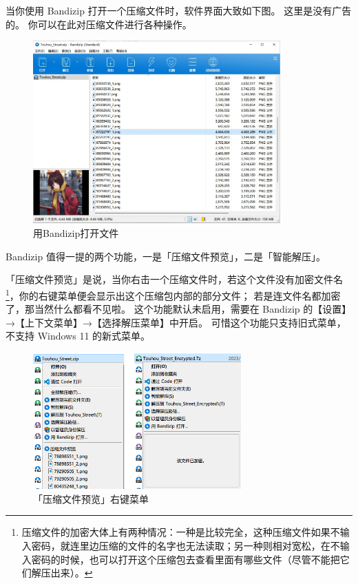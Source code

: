 当你使用 Bandizip 打开一个压缩文件时，软件界面大致如下图。
这里是没有广告的。
你可以在此对压缩文件进行各种操作。

\begin{figure}[htb!]
  \centering
  \includegraphics[width=9.5cm]{assets/Bandizip_View.jpg}
  \caption{用Bandizip打开文件}
  \label{Bandizip_View}
\end{figure}

Bandizip 值得一提的两个功能，一是「压缩文件预览」，二是「智能解压」。

「压缩文件预览」是说，当你右击一个压缩文件时，若这个文件没有加密文件名\footnote{压缩文件的加密大体上有两种情况：一种是比较完全，这种压缩文件如果不输入密码，就连里边压缩的文件的名字也无法读取；另一种则相对宽松，在不输入密码的时候，也可以打开这个压缩包去查看里面有哪些文件（尽管不能把它们解压出来）。}，你的右键菜单便会显示出这个压缩包内部的部分文件；
若是连文件名都加密了，那当然什么都看不见啦。
这个功能默认未启用，需要在 Bandizip 的【设置】→【上下文菜单】→【选择解压菜单】中开启。
可惜这个功能只支持旧式菜单，不支持 Windows 11 的新式菜单。

\begin{figure}[htb!]
  \centering
  \includegraphics[width=8cm]{assets/Compressed_Preview.png}
  \caption{「压缩文件预览」右键菜单}
  \label{Compressed_Preview}
\end{figure}


